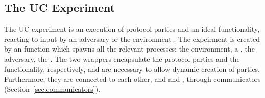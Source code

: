 
\subsection{The UC Experiment}
The UC experiment is an execution of protocol parties and an ideal functionality, reacting to input by an adversary \A or the environment \Z.
The expeirment is created by an  function which spawns all the relevant processes: the environment, a \partywrapper, the adversary, the \fwrapper.
The two wrappers encapsulate the protocol parties and the functionality, respectively, and are necessary to allow dynamic creation of parties. Furthermore, they are connected to each other, and \Z and \A, through communicators (Section~\ref{sec:communicators}).

